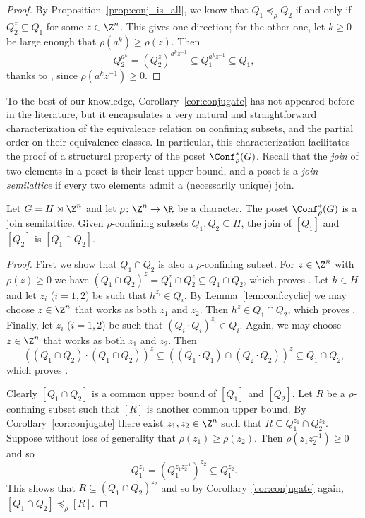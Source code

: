 \begin{proof}
By Proposition~\ref{prop:conj_is_all}, we know that $Q_1 \preceq_\rho Q_2$ if and only if $Q_2^z \subseteq Q_1$ for some $z \in \Z^n$. This gives one direction; for the other one, let $k \geq 0$ be large enough that $\rho(a^k) \geq \rho(z)$. Then
\[Q_2^{a^k} = (Q_2^z)^{a^k z^{-1}} \subseteq Q_1^{a^k z^{-1}} \subseteq Q_1,\]
thanks to \StayInConf, since $\rho(a^k z^{-1}) \geq 0$.
\end{proof}

To the best of our knowledge, Corollary~\ref{cor:conjugate} has not appeared before in the literature, but it encapsulates a very natural and straightforward characterization of the equivalence relation on confining subsets, and the partial order on their equivalence classes. In particular, this characterization facilitates the proof of a structural property of the poset $\Conf^\ast_\rho(G)$. Recall that the \emph{join} of two elements in a poset is their least upper bound, and a poset is a \emph{join semilattice} if every two elements admit a (necessarily unique) join.

\begin{prop}
\label{prop:join}

Let $G=H\rtimes \Z^n$ and let $\rho\colon \Z^n \to\R$ be a character. The poset $\Conf^\ast_\rho(G)$ is a join semilattice. Given $\rho$-confining subsets $Q_1, Q_2 \subseteq H$, the join of $[Q_1]$ and $[Q_2]$ is $[Q_1 \cap Q_2]$.
\end{prop}

\begin{proof}
First we show that $Q_1 \cap Q_2$ is also a $\rho$-confining subset. For $z \in \Z^n$ with $\rho(z) \geq 0$ we have $(Q_1 \cap Q_2)^z = Q_1^z \cap Q_2^z \subseteq Q_1 \cap Q_2$, which proves \StayInConf.
Let $h \in H$ and let $z_i$ ($i=1,2$) be such that $h^{z_i} \in Q_i$. By Lemma~\ref{lem:conf:cyclic} we may choose $z \in \Z^n$ that works as both $z_1$ and $z_2$. Then $h^z \in Q_1 \cap Q_2$, which proves \GetInConf.
Finally, let $z_i$ ($i=1,2$) be such that $(Q_i \cdot Q_i)^{z_i} \in Q_i$. Again, we may choose $z \in \Z^n$ that works as both $z_1$ and $z_2$. Then
\[
((Q_1 \cap Q_2) \cdot (Q_1 \cap Q_2))^{z} \subseteq ((Q_1 \cdot Q_1) \cap (Q_2 \cdot Q_2))^{z} \subseteq Q_1 \cap Q_2,
\]
which proves \ProdConf.

Clearly $[Q_1 \cap Q_2]$ is a common upper bound of $[Q_1]$ and $[Q_2]$. Let $R$ be a $\rho$-confining subset such that $[R]$ is another common upper bound. By Corollary~\ref{cor:conjugate} there exist $z_1, z_2 \in \Z^n$ such that $R \subseteq Q_1^{z_1} \cap Q_2^{z_2}$. Suppose without loss of generality that $\rho(z_1) \geq \rho(z_2)$. Then $\rho(z_1 z_2^{-1}) \geq 0$ and so \[Q_1^{z_1} = (Q_1^{z_1 z_2^{-1}})^{z_2} \subseteq Q_1^{z_2}.\]
This shows that $R \subseteq (Q_1 \cap Q_2)^{z_2}$ and so by Corollary~\ref{cor:conjugate} again, $[Q_1 \cap Q_2] \preccurlyeq_\rho [R]$.
\end{proof}

